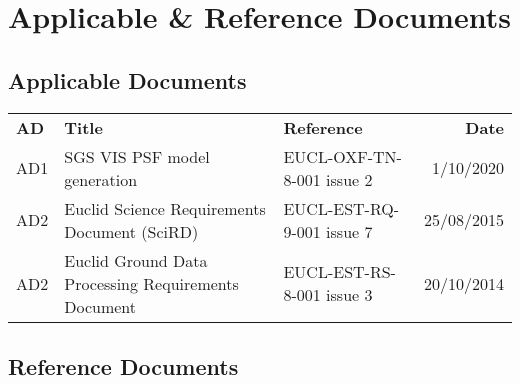 \documentclass[11pt]{EuclidVIS}
\numberwithin{table}{section}
\numberwithin{figure}{section}
\begin{document}
\newpage



\section*{Applicable \& Reference Documents}

\subsection{Applicable Documents}

\noindent
\begin{tabularx}{1.0\textwidth}{ | l | X | X | r |}
\hline
\rowcolor{gray!30}
\textbf{AD} & \textbf{Title} & \textbf{Reference} & \textbf{Date}\\
AD1 & SGS VIS PSF model generation & EUCL-OXF-TN-8-001 issue 2 & 1/10/2020 \\
\hline
AD2 & Euclid Science Requirements Document (SciRD) & EUCL-EST-RQ-9-001 issue 7 & 25/08/2015 \\
\hline
AD2 & Euclid Ground Data Processing Requirements Document & EUCL-EST-RS-8-001 issue 3 & 20/10/2014 \\
\hline
\end{tabularx}


\begingroup
\subsection{Reference Documents}
\let\clearpage\relax %
\vspace*{-3cm}
\renewcommand{\bibname}{}


\endgroup


\end{document}
